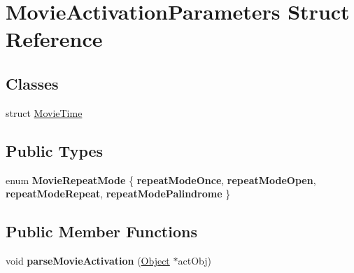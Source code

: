 \hypertarget{struct_movie_activation_parameters}{}\section{Movie\+Activation\+Parameters Struct Reference}
\label{struct_movie_activation_parameters}
\subsection*{Classes}
\begin{DoxyCompactItemize}
\item 
struct \hyperlink{struct_movie_activation_parameters_1_1_movie_time}{Movie\+Time}
\end{DoxyCompactItemize}
\subsection*{Public Types}
\begin{DoxyCompactItemize}
\item 
\mbox{\label{struct_movie_activation_parameters_aa582c778859e24d6464e3ef955bdd72d}} 
enum {\bfseries Movie\+Repeat\+Mode} \{ {\bfseries repeat\+Mode\+Once}, 
{\bfseries repeat\+Mode\+Open}, 
{\bfseries repeat\+Mode\+Repeat}, 
{\bfseries repeat\+Mode\+Palindrome}
 \}
\end{DoxyCompactItemize}
\subsection*{Public Member Functions}
\begin{DoxyCompactItemize}
\item 
\mbox{\label{struct_movie_activation_parameters_a066b7a6de7d45ca4c02799b4aee8dfd0}} 
void {\bfseries parse\+Movie\+Activation} (\hyperlink{class_object}{Object} $\ast$act\+Obj)
\end{DoxyCompactItemize}
